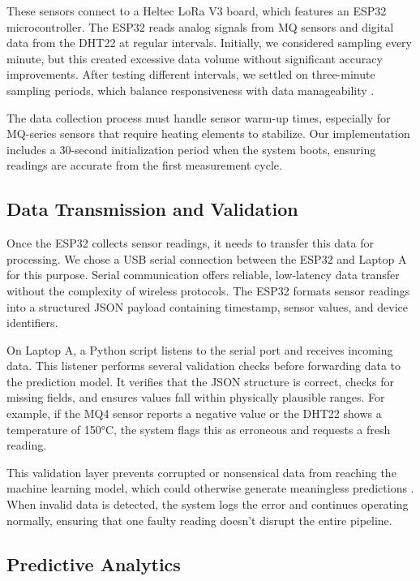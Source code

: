 These sensors connect to a Heltec LoRa V3 board, which features an ESP32 microcontroller. The ESP32 reads analog signals from MQ sensors and digital data from the DHT22 at regular intervals. Initially, we considered sampling every minute, but this created excessive data volume without significant accuracy improvements. After testing different intervals, we settled on three-minute sampling periods, which balance responsiveness with data manageability \cite{augustin2016study}.

The data collection process must handle sensor warm-up times, especially for MQ-series sensors that require heating elements to stabilize. Our implementation includes a 30-second initialization period when the system boots, ensuring readings are accurate from the first measurement cycle.

\subsection{Data Transmission and Validation}

Once the ESP32 collects sensor readings, it needs to transfer this data for processing. We chose a USB serial connection between the ESP32 and Laptop A for this purpose. Serial communication offers reliable, low-latency data transfer without the complexity of wireless protocols. The ESP32 formats sensor readings into a structured JSON payload containing timestamp, sensor values, and device identifiers.

On Laptop A, a Python script listens to the serial port and receives incoming data. This listener performs several validation checks before forwarding data to the prediction model. It verifies that the JSON structure is correct, checks for missing fields, and ensures values fall within physically plausible ranges. For example, if the MQ4 sensor reports a negative value or the DHT22 shows a temperature of 150°C, the system flags this as erroneous and requests a fresh reading.

This validation layer prevents corrupted or nonsensical data from reaching the machine learning model, which could otherwise generate meaningless predictions \cite{berzal2018data}. When invalid data is detected, the system logs the error and continues operating normally, ensuring that one faulty reading doesn't disrupt the entire pipeline.

\subsection{Predictive Analytics}

